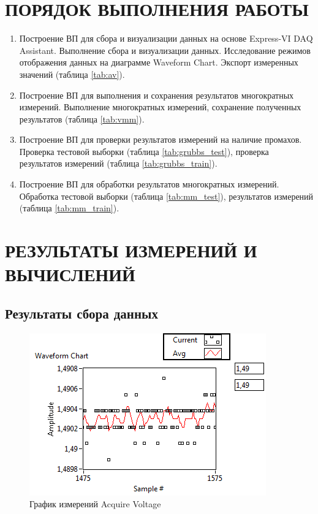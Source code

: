 \documentclass[a4paper,14pt]{article}
\begin{document}
\section{ПОРЯДОК ВЫПОЛНЕНИЯ РАБОТЫ}
\begin{enumerate}
\item     Построение ВП для сбора и визуализации данных на основе Express-VI DAQ Assistant.
 Выполнение сбора и визуализации данных.
 Исследование режимов отображения данных на диаграмме Waveform Chart.
 Экспорт измеренных значений (таблица \ref{tab:av}).
 
\item     Построение ВП для выполнения и сохранения результатов многократных измерений.
 Выполнение многократных измерений, сохранение полученных результатов (таблица \ref{tab:vmm}).
 
\item     Построение ВП для проверки результатов измерений на наличие промахов.
Проверка тестовой выборки (таблица \ref{tab:grubbs_test}), проверка результатов измерений (таблица  \ref{tab:grubbs_train}).

\item     Построение ВП для обработки результатов многократных измерений.
Обработка тестовой выборки (таблица \ref{tab:mm_test}), результатов измерений (таблица \ref{tab:mm_train}).

\end{enumerate}

\section{ РЕЗУЛЬТАТЫ ИЗМЕРЕНИЙ И ВЫЧИСЛЕНИЙ}

\subsection{Результаты сбора данных}

\begin{figure}[H]
	\centering
	\includegraphics[width=\linewidth]{image/av_graph}
	\caption{График измерений Acquire Voltage}\label{img:av_graph}
\end{figure}
\end{document}
